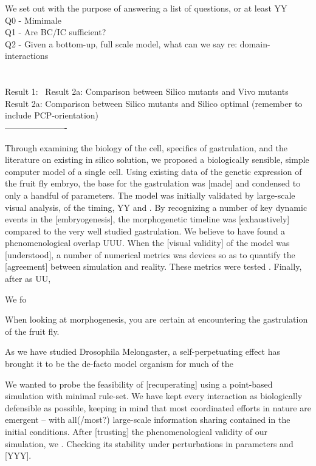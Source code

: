 We set out with the purpose of answering a list of questions, or at least YY\\

Q0 - Mimimale\\
Q1 - Are BC/IC sufficient?\\
Q2 - Given a bottom-up, full scale model, what can we say re: domain-interactions\\
\\\\
Result 1: \
Result 2a: Comparison between Silico mutants and Vivo mutants\\
Result 2a: Comparison between Silico mutants and Silico optimal (remember to include PCP-orientation)\\

----------------------

Through examining the biology of the cell, specifics of gastrulation, and the literature on existing in silico solution, we proposed a biologically sensible, simple computer model of a single cell. Using existing data of the genetic expression of the fruit fly embryo, the base for the gastrulation was [made] and condensed to only a handful of parameters. 
The model was initially validated by large-scale visual analysis, of the timing, YY and . By recognizing a number of key dynamic events in the [embryogenesis], the morphogenetic timeline was [exhaustively] compared to the very well studied gastrulation. We believe to have found a phenomenological overlap UUU. 
When the [visual validity] of the model was [understood], a number of numerical metrics was devices so as to quantify the [agreement] between simulation and reality. These metrics were tested .
Finally, after as UU, 

We fo



When looking at morphogenesis, you are certain at encountering the gastrulation of the fruit fly.

As we have studied Drosophila Melongaster, a self-perpetuating effect has brought it to be the de-facto model organism for much of the 

We wanted to probe the feasibility of [recuperating] using a point-based simulation with minimal rule-set. We have kept every interaction as biologically defensible as possible, keeping in mind that most coordinated efforts in nature are emergent -- with all(/most?) large-scale information sharing contained in the initial conditions.
After [trusting] the phenomenological validity of our simulation, we . Checking its stability under perturbations in parameters and [YYY].\\

